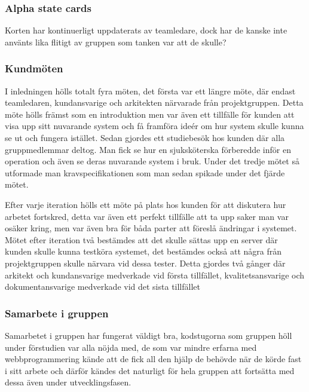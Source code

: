 \subsubsection{Alpha state cards}
Korten har kontinuerligt uppdaterats av teamledare, dock har de kanske inte använts lika flitigt av gruppen som tanken var att de skulle?

\subsubsection{Kundmöten}
I inledningen hölls totalt fyra möten, det första var ett längre möte, där endast teamledaren, kundansvarige och arkitekten närvarade från projektgruppen. Detta möte hölls främst som en introduktion men var även ett tillfälle för kunden att visa upp sitt nuvarande system och få framföra ideér om hur system skulle kunna se ut och fungera istället. Sedan gjordes ett studiebesök hos kunden där alla gruppmedlemmar deltog. Man fick se hur en sjuksköterska förberedde inför en operation och även se deras nuvarande system i bruk. Under det tredje mötet så utformade man kravspecifikationen som man sedan spikade under det fjärde mötet.

Efter varje iteration hölls ett möte på plats hos kunden för att diskutera hur arbetet fortskred, detta var även ett perfekt tillfälle att ta upp saker man var osäker kring, men var även bra för båda parter att föreslå ändringar i systemet. Mötet efter iteration två bestämdes att det skulle sättas upp en server där kunden skulle kunna testköra systemet, det bestämdes också att några från projektgruppen skulle närvara vid dessa tester. Detta gjordes två gånger där arkitekt och kundansvarige medverkade vid första tillfället, kvalitetsansvarige och dokumentansvarige medverkade vid det sista tillfället

\subsubsection{Samarbete i gruppen}
Samarbetet i gruppen har fungerat väldigt bra, kodstugorna som gruppen höll under förstudien var alla nöjda med, de som var mindre erfarna med webbprogrammering kände att de fick all den hjälp de behövde när de körde fast i sitt arbete och därför kändes det naturligt för hela gruppen att fortsätta med dessa även under utvecklingsfasen.

